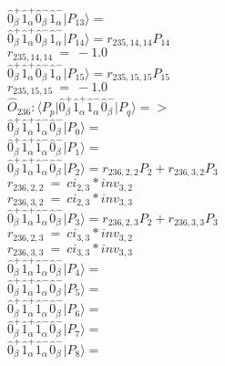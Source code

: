 \documentclass[14pt]{article}
\begin{document}
    $ \hat{0}_{\beta}^{+}\hat{1}_{\alpha}^{+}\hat{0}_{\beta}^{-}\hat{1}_{\alpha}^{-} \vert{P_{13}}\rangle =  $ \\ 
    $ \hat{0}_{\beta}^{+}\hat{1}_{\alpha}^{+}\hat{0}_{\beta}^{-}\hat{1}_{\alpha}^{-} \vert{P_{14}}\rangle = {r}_{235,14,14}P_{14} $ \\ 
    ${r}_{235,14,14}\ =\ -1.0 $ \\ 
    $ \hat{0}_{\beta}^{+}\hat{1}_{\alpha}^{+}\hat{0}_{\beta}^{-}\hat{1}_{\alpha}^{-} \vert{P_{15}}\rangle = {r}_{235,15,15}P_{15} $ \\ 
    ${r}_{235,15,15}\ =\ -1.0 $ \\ 
    
    $\hat{O}_{236}:  \langle{P_p}\vert \hat{0}_{\beta}^{+}\hat{1}_{\alpha}^{+}\hat{1}_{\alpha}^{-}\hat{0}_{\beta}^{-} \vert{P_q}\rangle => $ \\ 
    $ \hat{0}_{\beta}^{+}\hat{1}_{\alpha}^{+}\hat{1}_{\alpha}^{-}\hat{0}_{\beta}^{-} \vert{P_{0}}\rangle =  $ \\ 
    $ \hat{0}_{\beta}^{+}\hat{1}_{\alpha}^{+}\hat{1}_{\alpha}^{-}\hat{0}_{\beta}^{-} \vert{P_{1}}\rangle =  $ \\ 
    $ \hat{0}_{\beta}^{+}\hat{1}_{\alpha}^{+}\hat{1}_{\alpha}^{-}\hat{0}_{\beta}^{-} \vert{P_{2}}\rangle = {r}_{236,2,2}P_{2}+{r}_{236,3,2}P_{3} $ \\ 
    ${r}_{236,2,2}\ =\ {ci}_{2,3}*{inv}_{3,2} $ \\ 
    ${r}_{236,3,2}\ =\ {ci}_{2,3}*{inv}_{3,3} $ \\ 
    $ \hat{0}_{\beta}^{+}\hat{1}_{\alpha}^{+}\hat{1}_{\alpha}^{-}\hat{0}_{\beta}^{-} \vert{P_{3}}\rangle = {r}_{236,2,3}P_{2}+{r}_{236,3,3}P_{3} $ \\ 
    ${r}_{236,2,3}\ =\ {ci}_{3,3}*{inv}_{3,2} $ \\ 
    ${r}_{236,3,3}\ =\ {ci}_{3,3}*{inv}_{3,3} $ \\ 
    $ \hat{0}_{\beta}^{+}\hat{1}_{\alpha}^{+}\hat{1}_{\alpha}^{-}\hat{0}_{\beta}^{-} \vert{P_{4}}\rangle =  $ \\ 
    $ \hat{0}_{\beta}^{+}\hat{1}_{\alpha}^{+}\hat{1}_{\alpha}^{-}\hat{0}_{\beta}^{-} \vert{P_{5}}\rangle =  $ \\ 
    $ \hat{0}_{\beta}^{+}\hat{1}_{\alpha}^{+}\hat{1}_{\alpha}^{-}\hat{0}_{\beta}^{-} \vert{P_{6}}\rangle =  $ \\ 
    $ \hat{0}_{\beta}^{+}\hat{1}_{\alpha}^{+}\hat{1}_{\alpha}^{-}\hat{0}_{\beta}^{-} \vert{P_{7}}\rangle =  $ \\ 
    $ \hat{0}_{\beta}^{+}\hat{1}_{\alpha}^{+}\hat{1}_{\alpha}^{-}\hat{0}_{\beta}^{-} \vert{P_{8}}\rangle =  $ \\ 
\end{document}
